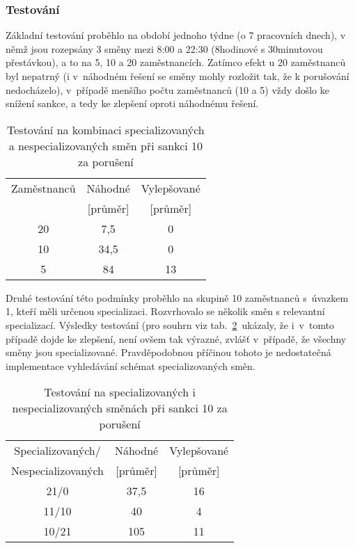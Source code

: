 \documentclass[twoside]{ctuthesis}
\begin{document}
\subsubsection{Testování}

Základní testování proběhlo na období jednoho týdne (o 7 pracovních dnech), v němž jsou rozepsány 3 směny mezi 8:00 a 22:30 (8hodinové s 30minutovou přestávkou), a to na 5, 10 a 20 zaměstnancích. Zatímco efekt u 20 zaměstnanců byl nepatrný (i v~náhodném řešení se směny mohly rozložit tak, že k porušování nedocházelo), v~případě menšího počtu zaměstnanců (10 a 5) vždy došlo ke snížení sankce, a tedy ke zlepšení oproti náhodnému řešení.


\begin{table}[h!]
\begin{tabular}{|c|c|c|}
	\hline
	Zaměstnanců & Náhodné & Vylepšované \\
	& [průměr] & [průměr] \\
	\hline
	20 & 7,5 & 0 \\
	10 & 34,5 & 0 \\
	5 & 84 & 13 \\
	\hline
\end{tabular}
	\caption{Testování na kombinaci specializovaných a nespecializovaných směn při sankci 10 za porušení}
	\label{tab:noemptyunspecialized}
\end{table}

Druhé testování této podmínky proběhlo na skupině 10 zaměstnanců s~úvazkem 1, kteří měli určenou specializaci. Rozvrhovalo se několik směn s relevantní specializací. Výsledky testování (pro souhrn viz tab.~\ref{tab:noemptyspecialized} ukázaly, že i~v~tomto případě dojde ke zlepšení, není ovšem tak výrazné, zvlášť v~případě, že všechny směny jsou specializované. Pravděpodobnou příčinou tohoto je nedostatečná implementace vyhledávání schémat specializovaných směn.

\begin{table}[h!]
	\caption{Testování na specializovaných i nespecializovaných směnách při sankci 10 za porušení}
	\label{tab:noemptyspecialized}
	\begin{tabular}{|c|c|c|}
		\hline
		Specializovaných/ & Náhodné & Vylepšované \\
		Nespecializovaných & [průměr] & [průměr] \\
		\hline
		21/0 & 37,5 & 16 \\
		11/10 & 40 & 4 \\
		10/21 & 105 & 11 \\
		\hline
	\end{tabular}

\end{table}
\end{document}
